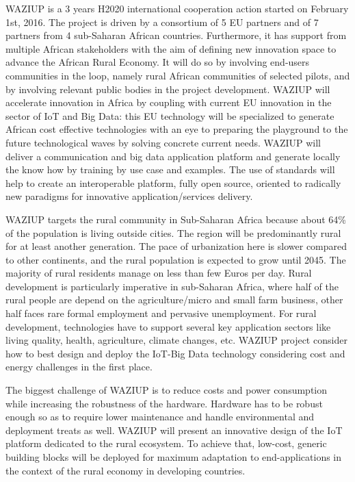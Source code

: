 WAZIUP is a 3 years H2020 international cooperation action started on February 1st, 2016.
The project is driven by a consortium of 5 EU partners and of 7 partners from 4 sub-Saharan African countries.
Furthermore, it has support from multiple African stakeholders with the aim of defining new innovation space to advance the African Rural Economy.
It will do so by involving end-users communities in the loop, namely rural African communities of selected pilots, and by involving relevant public bodies in the project development.
WAZIUP will accelerate innovation in Africa by coupling with current EU innovation in the sector of IoT and Big Data: this EU technology will be specialized to generate African cost effective technologies with an eye to preparing the playground to the future technological waves by solving concrete current needs.
WAZIUP will deliver a communication and big data application platform and generate locally the know how by training by use case and examples.
The use of standards will help to create an interoperable platform, fully open source, oriented to radically new paradigms for innovative application/services delivery.

WAZIUP targets the rural community in Sub-Saharan Africa because about 64\% of the population is living outside cities.
The region will be predominantly rural for at least another generation.
The pace of urbanization here is slower compared to other continents, and the rural population is expected to grow until 2045.
The majority of rural residents manage on less than few Euros per day.
Rural development is particularly imperative in sub-Saharan Africa, where half of the rural people are depend on the agriculture/micro and small farm business, other half faces rare formal employment and pervasive unemployment.
For rural development, technologies have to support several key application sectors like living quality, health, agriculture, climate changes, etc.
WAZIUP project consider how to best design and deploy the IoT-Big Data technology considering cost and energy challenges in the first place.

The biggest challenge of WAZIUP is to reduce costs and power consumption while increasing the robustness of the hardware. 
Hardware has to be robust enough so as to require lower maintenance and handle environmental and deployment treats as well. 
WAZIUP will present an innovative design of the IoT platform dedicated to the rural ecosystem. 
To achieve that, low-cost, generic building blocks will be deployed for maximum adaptation to end-applications in the context of the rural economy in developing countries. 

